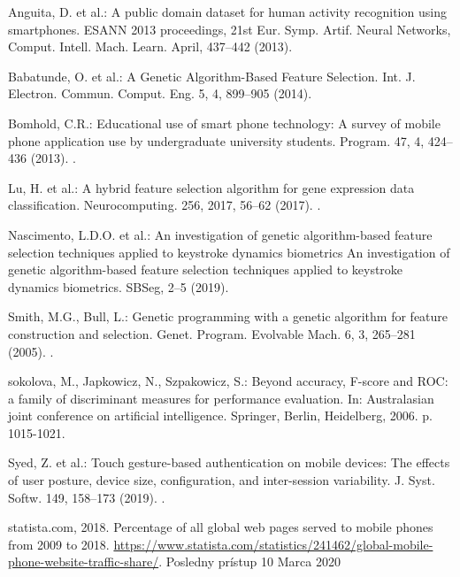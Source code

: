 \documentclass[runningheads]{llncs}
\begin{document}
\begin{thebibliography}{8}

Anguita, D. et al.: A public domain dataset for human activity recognition using smartphones. ESANN 2013 proceedings, 21st Eur. Symp. Artif. Neural Networks, Comput. Intell. Mach. Learn. April, 437–442 (2013).

Babatunde, O. et al.: A Genetic Algorithm-Based Feature Selection. Int. J. Electron. Commun. Comput. Eng. 5, 4, 899–905 (2014).

Bomhold, C.R.: Educational use of smart phone technology: A survey of mobile phone application use by undergraduate university students. Program. 47, 4, 424–436 (2013). .

Lu, H. et al.: A hybrid feature selection algorithm for gene expression data classification. Neurocomputing. 256, 2017, 56–62 (2017). .

Nascimento, L.D.O. et al.: An investigation of genetic algorithm-based feature selection techniques applied to keystroke dynamics biometrics An investigation of genetic algorithm-based feature selection techniques applied to keystroke dynamics biometrics. SBSeg, 2–5 (2019).

Smith, M.G., Bull, L.: Genetic programming with a genetic algorithm for feature construction and selection. Genet. Program. Evolvable Mach. 6, 3, 265–281 (2005). .


sokolova, M., Japkowicz, N., Szpakowicz, S.: Beyond accuracy, F-score and ROC: a family of discriminant measures for performance evaluation. In: Australasian joint conference on artificial intelligence. Springer, Berlin, Heidelberg, 2006. p. 1015-1021.


Syed, Z. et al.: Touch gesture-based authentication on mobile devices: The effects of user posture, device size, configuration, and inter-session variability. J. Syst. Softw. 149, 158–173 (2019). .

statista.com, 2018. Percentage of all global web pages served to mobile phones from 2009 to 2018. \url{https://www.statista.com/statistics/241462/global-mobile-phone-website-traffic-share/}. Posledny prístup 10 Marca 2020


\end{thebibliography}
\end{document}

